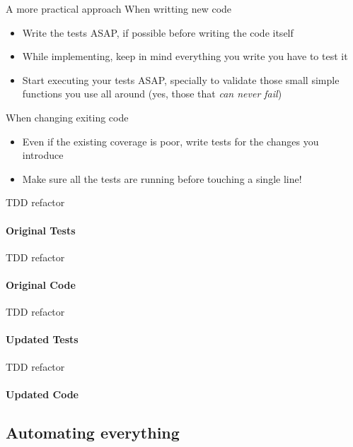\documentclass[aspectratio=169]{beamer}
\begin{document}
\begin{frame}{A more practical approach}
    When writting new code
    \begin{itemize}
    \item Write the tests ASAP, if possible before writing the code itself
    \item While implementing, keep in mind everything you write you have to test it
    \item Start executing your tests ASAP, specially to validate those small simple functions you use all around (yes,
    those that \emph{can never fail})
    \pause
    \end{itemize}
    When changing exiting code
    \begin{itemize}
    \item Even if the existing coverage is poor, write tests for the changes you introduce
    \item Make sure all the tests are running before touching a single line!
    \end{itemize}
\end{frame}

\begin{frame}{TDD refactor}
    \framesubtitle{Original Tests}
    
\end{frame}

\begin{frame}{TDD refactor}
    \framesubtitle{Original Code}
    
\end{frame}

\begin{frame}{TDD refactor}
    \framesubtitle{Updated Tests}
    
\end{frame}

\begin{frame}{TDD refactor}
    \framesubtitle{Updated Code}
    
\end{frame}

\subsection*{Automating everything}
\label{automating_everything}
\end{document}
